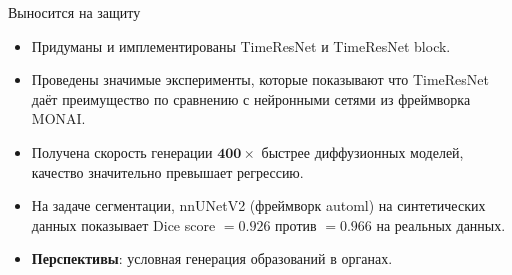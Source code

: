 \documentclass[11pt]{beamer}
\begin{document}
\begin{frame}{Выносится на защиту}
\begin{itemize}
  \item Придуманы и имплементированы TimeResNet и TimeResNet block.
  \item Проведены значимые эксперименты, которые показывают что TimeResNet даёт преимущество по сравнению с нейронными сетями из фреймворка MONAI.
  \item Получена скорость генерации $\mathbf{400\times}$ быстрее диффузионных моделей, качество значительно превышает регрессию.
  \item На задаче сегментации, nnUNetV2 (фреймворк automl) на синтетических данных показывает Dice score $=0.926$ против $= 0.966$ на реальных данных.
  \item \textbf{Перспективы}: условная генерация образований в органах.
\end{itemize}
\end{frame}
\end{document}
